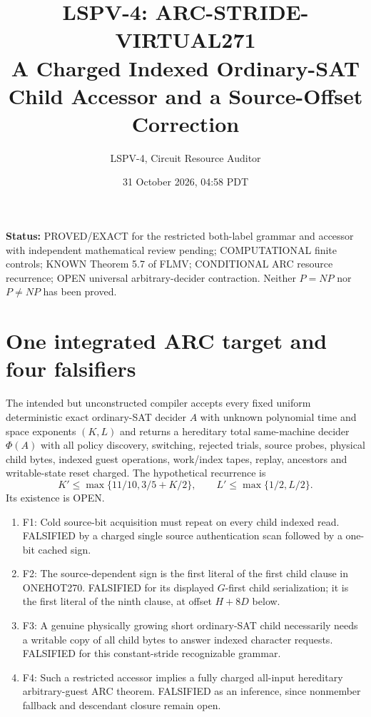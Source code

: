 \documentclass[11pt]{article}
\title{LSPV-4: ARC-STRIDE-VIRTUAL271\\A Charged Indexed Ordinary-SAT Child Accessor and a Source-Offset Correction}
\author{LSPV-4, Circuit Resource Auditor}
\date{31 October 2026, 04:58 PDT}
\begin{document}
\maketitle
\noindent\textbf{Status:} PROVED/EXACT for the restricted both-label grammar and accessor with independent mathematical review pending; COMPUTATIONAL finite controls; KNOWN Theorem 5.7 of FLMV; CONDITIONAL ARC resource recurrence; OPEN universal arbitrary-decider contraction. Neither $P=NP$ nor $P\ne NP$ has been proved.

\section{One integrated ARC target and four falsifiers}
The intended but unconstructed compiler accepts every fixed uniform deterministic exact ordinary-SAT decider $A$ with unknown polynomial time and space exponents $(K,L)$ and returns a hereditary total same-machine decider $\Phi(A)$ with all policy discovery, switching, rejected trials, source probes, physical child bytes, indexed guest operations, work/index tapes, replay, ancestors and writable-state reset charged. The hypothetical recurrence is
\[
 K'\leq\max\{11/10,3/5+K/2\},\qquad L'\leq\max\{1/2,L/2\}.
\]
Its existence is OPEN.
\begin{enumerate}
\item[] F1: Cold source-bit acquisition must repeat on every child indexed read. FALSIFIED by a charged single source authentication scan followed by a one-bit cached sign.
\item[] F2: The source-dependent sign is the first literal of the first child clause in ONEHOT270. FALSIFIED for its displayed $G$-first child serialization; it is the first literal of the ninth clause, at offset $H+8D$ below.
\item[] F3: A genuine physically growing short ordinary-SAT child necessarily needs a writable copy of all child bytes to answer indexed character requests. FALSIFIED for this constant-stride recognizable grammar.
\item[] F4: Such a restricted accessor implies a fully charged all-input hereditary arbitrary-guest ARC theorem. FALSIFIED as an inference, since nonmember fallback and descendant closure remain open.
\end{enumerate}
\end{document}
